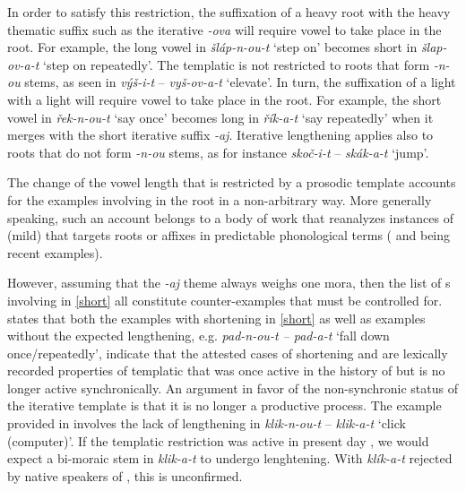 In order to satisfy this restriction, the suffixation of a heavy root with the heavy thematic suffix such as the iterative \textit{-ova} will require vowel  to take place in the root. For example, the long vowel in \textit{\v{s}l\'ap-n-ou-t} `step on' becomes short in \textit{\v{s}lap-ov-a-t} `step on repeatedly'. The templatic  is not restricted to roots that form \textit{-n-ou} stems, as seen in \textit{v\'y\v{s}-i-t} -- \textit{vy\v{s}-ov-a-t } `elevate'. In turn, the suffixation of a light  with a light   will require vowel  to take place in the root. For example, the short vowel in \textit{\v{r}ek-n-ou-t} `say once' becomes long in \textit{\v{r}\'ik-a-t} `say repeatedly' when it merges with the short iterative suffix \textit{-aj}. Iterative lengthening applies also to roots that do not form \textit{-n-ou} stems, as for instance  \textit{sko\v{c}-i-t} -- \textit{sk\'ak-a-t} `jump'.
\par
The change of the vowel length that is restricted by a prosodic template accounts for the examples involving  in the root in a non-arbitrary way. More generally speaking, such an account belongs to a body of work that reanaly\-zes instances of (mild)  that targets roots or affixes in predictable phonological terms (\citealt{Steriade2016} and \citealt{Kiparsky2018} being recent examples). 
\par
However, assuming that the \textit{-aj} theme always weighs one mora, then the list of s involving  in \ref{short} all constitute counter-examples that must be controlled for. \citet[115]{Scheer2003} states that both the examples with shortening in \ref{short} as well as examples without the expected lengthening, e.g. \textit{pad-n-ou-t -- pad-a-t} `fall down once/repeatedly', 
 indicate that the attested cases of  shortening and  are lexically recorded properties of templatic  that was once active in the history of  but is no longer active synchronically. An argument in favor of the non-synchronic status of the iterative template is that it is no longer a productive process. The example provided in \cite{Scheer2003} involves the lack of  lengthening in \textit{klik-n-ou-t} -- \textit{klik-a-t} `click (computer)'. If the templatic restriction was active in present day , we would expect a bi-moraic stem in \textit{klik-a-t} to undergo lenghtening. With \textit{kl\'ik-a-t} rejected by native speakers of , this is unconfirmed.


